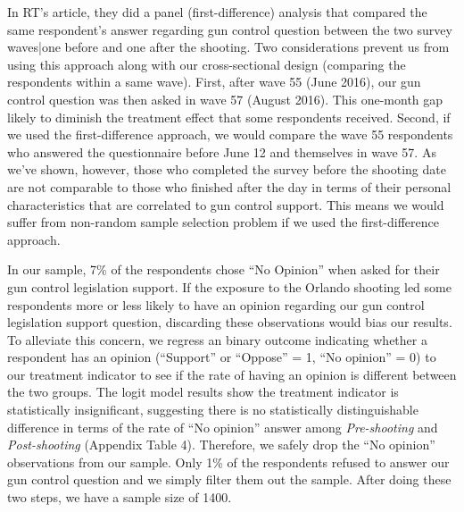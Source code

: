\documentclass[11pt]{article}
\begin{document}
In RT's article, they did a panel (first-difference) analysis that compared the same respondent's answer regarding gun control question between the two survey waves|one before and one after the shooting. Two considerations prevent us from using this approach along with our cross-sectional design (comparing the respondents within a same wave). First, after wave 55 (June 2016), our gun control question was then asked in wave 57 (August 2016). This one-month gap likely to diminish the treatment effect that some respondents received. Second, if we used the first-difference approach, we would compare the wave 55 respondents who answered the questionnaire before June 12 and themselves in wave 57. As we've shown, however, those who completed the survey before the shooting date are not comparable to those who finished after the day in terms of their personal characteristics that are correlated to gun control support. This means we would suffer from non-random sample selection problem if we used the first-difference approach.

In our sample, 7\% of the respondents chose ``No Opinion'' when asked for their gun control legislation support. If the exposure to the Orlando shooting led some respondents more or less likely to have an opinion regarding our gun control legislation support question, discarding these observations would bias our results. To alleviate this concern, we regress an binary outcome indicating whether a respondent has an opinion (``Support'' or ``Oppose'' = 1, ``No opinion'' = 0) to our treatment indicator to see if the rate of having an opinion is different between the two groups. The logit model results show the treatment indicator is statistically insignificant, suggesting there is no statistically distinguishable difference in terms of the rate of ``No opinion'' answer among \emph{Pre-shooting} and \emph{Post-shooting} (Appendix Table 4). Therefore, we safely drop the ``No opinion'' observations from our sample. Only 1\% of the respondents refused to answer our gun control question and we simply filter them out the sample. After doing these two steps, we have a sample size of 1400.
\end{document}
